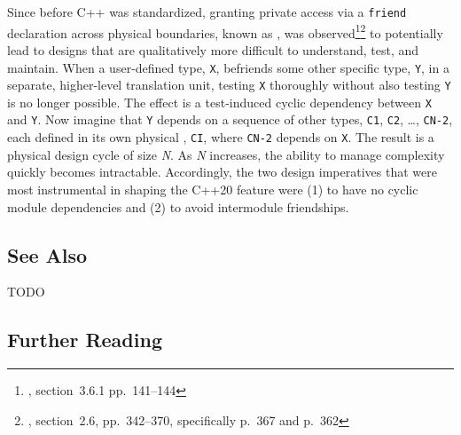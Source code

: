 Since before C++ was standardized, granting private access via a
\lstinline!friend! declaration across physical boundaries, known as
, was
observed{\cprotect\footnote{\cite{lakos96}, section~3.6.1
  pp.~141--144}}{\cprotect\footnote{\cite{lakos20}, section~2.6,
  pp.~342--370, specifically p.~367 and p.~362}} to potentially lead
to designs that are qualitatively more difficult to understand, test,
and maintain. When a user-defined type, \lstinline!X!, befriends some other
specific type, \lstinline!Y!, in a separate, higher-level translation unit,
testing \lstinline!X! thoroughly without also testing \lstinline!Y! is no
longer possible. The effect is a test-induced cyclic dependency between
\lstinline!X! and \lstinline!Y!. Now imagine that \lstinline!Y! depends on a
sequence of other types, \lstinline!C1!, \lstinline!C2!, \ldots,
\lstinline!CN-2!, each defined in its own physical ,
\lstinline!CI!, where \lstinline!CN-2! depends on \lstinline!X!. The result is a
physical design cycle of size \emph{N}. As \emph{N} increases, the
ability to manage complexity quickly becomes intractable. Accordingly,
the two design imperatives that were most instrumental in shaping the
C++20  feature were (1) to have no cyclic module
dependencies and (2) to avoid intermodule friendships.

\subsection[See Also]{See Also}\label{see-also}

TODO

\subsection[Further Reading]{Further Reading}\label{further-reading}


